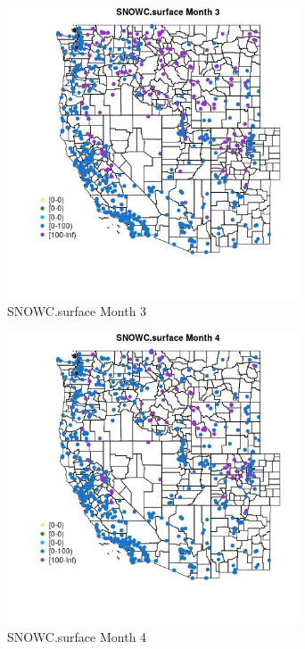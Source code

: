 \begin{figure} 
\centering  
\includegraphics[width=0.77\textwidth]{Code_Outputs/Report_ML_input_PM25_Step4_part_f_de_duplicated_aveswNAs_MapObsMo3SNOWCsurface.jpg} 
\caption{\label{fig:Report_ML_input_PM25_Step4_part_f_de_duplicated_aveswNAsMapObsMo3SNOWCsurface}SNOWC.surface Month 3} 
\end{figure} 
 

\begin{figure} 
\centering  
\includegraphics[width=0.77\textwidth]{Code_Outputs/Report_ML_input_PM25_Step4_part_f_de_duplicated_aveswNAs_MapObsMo4SNOWCsurface.jpg} 
\caption{\label{fig:Report_ML_input_PM25_Step4_part_f_de_duplicated_aveswNAsMapObsMo4SNOWCsurface}SNOWC.surface Month 4} 
\end{figure} 
 

